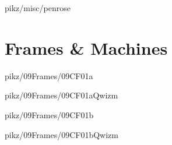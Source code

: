 \documentclass[9pt,xcolor={svgnames, x11names}]{beamer}
\begin{document}

\begin{frame}{pikz/misc/penrose}
  
\end{frame}


%   


\section{Frames \& Machines}


\begin{frame}{pikz/09Frames/09CF01a}
  
\end{frame}


\begin{frame}{pikz/09Frames/09CF01aQwizm}
  
\end{frame}


\begin{frame}{pikz/09Frames/09CF01b}
  
\end{frame}


\begin{frame}{pikz/09Frames/09CF01bQwizm}
  
\end{frame}
\end{document}
